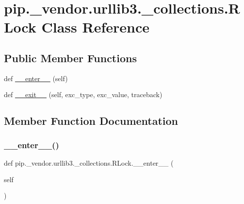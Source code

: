 \hypertarget{classpip_1_1__vendor_1_1urllib3_1_1__collections_1_1RLock}{}\section{pip.\+\_\+vendor.\+urllib3.\+\_\+collections.\+R\+Lock Class Reference}
\label{classpip_1_1__vendor_1_1urllib3_1_1__collections_1_1RLock}
\subsection*{Public Member Functions}
\begin{DoxyCompactItemize}
\item 
def \hyperlink{classpip_1_1__vendor_1_1urllib3_1_1__collections_1_1RLock_a85c41b8bc4976f9da5c585b0dd3e9d15}{\+\_\+\+\_\+enter\+\_\+\+\_\+} (self)
\item 
def \hyperlink{classpip_1_1__vendor_1_1urllib3_1_1__collections_1_1RLock_a76a714bc36425739430aa7786f66fbbe}{\+\_\+\+\_\+exit\+\_\+\+\_\+} (self, exc\+\_\+type, exc\+\_\+value, traceback)
\end{DoxyCompactItemize}


\subsection{Member Function Documentation}
\mbox{\label{classpip_1_1__vendor_1_1urllib3_1_1__collections_1_1RLock_a85c41b8bc4976f9da5c585b0dd3e9d15}} 
\subsubsection{\texorpdfstring{\+\_\+\+\_\+enter\+\_\+\+\_\+()}{\_\_enter\_\_()}}
{\footnotesize\ttfamily def pip.\+\_\+vendor.\+urllib3.\+\_\+collections.\+R\+Lock.\+\_\+\+\_\+enter\+\_\+\+\_\+ (\begin{DoxyParamCaption}\item[{}]{self }\end{DoxyParamCaption})}

